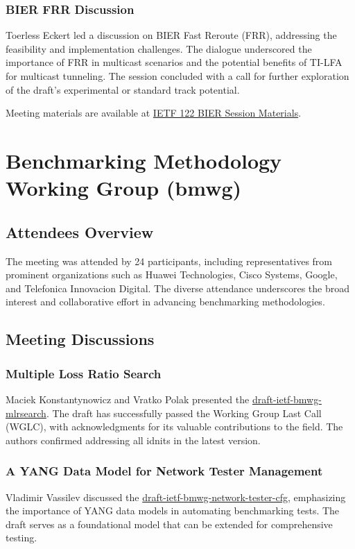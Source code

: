 \documentclass{article}
\begin{document}
\subsubsection{BIER FRR Discussion}
Toerless Eckert led a discussion on BIER Fast Reroute (FRR), addressing the feasibility and implementation challenges. The dialogue underscored the importance of FRR in multicast scenarios and the potential benefits of TI-LFA for multicast tunneling. The session concluded with a call for further exploration of the draft's experimental or standard track potential.

Meeting materials are available at \href{https://datatracker.ietf.org/meeting/122/materials/agenda-122-bier}{IETF 122 BIER Session Materials}.



\newpage

\section{Benchmarking Methodology Working Group (bmwg)}

\subsection{Attendees Overview}
The meeting was attended by 24 participants, including representatives from prominent organizations such as Huawei Technologies, Cisco Systems, Google, and Telefonica Innovacion Digital. The diverse attendance underscores the broad interest and collaborative effort in advancing benchmarking methodologies.

\subsection{Meeting Discussions}

\subsubsection{Multiple Loss Ratio Search}
Maciek Konstantynowicz and Vratko Polak presented the \href{https://datatracker.ietf.org/doc/html/draft-ietf-bmwg-mlrsearch}{draft-ietf-bmwg-mlrsearch}. The draft has successfully passed the Working Group Last Call (WGLC), with acknowledgments for its valuable contributions to the field. The authors confirmed addressing all idnits in the latest version.

\subsubsection{A YANG Data Model for Network Tester Management}
Vladimir Vassilev discussed the \href{https://datatracker.ietf.org/doc/html/draft-ietf-bmwg-network-tester-cfg}{draft-ietf-bmwg-network-tester-cfg}, emphasizing the importance of YANG data models in automating benchmarking tests. The draft serves as a foundational model that can be extended for comprehensive testing.
\end{document}

